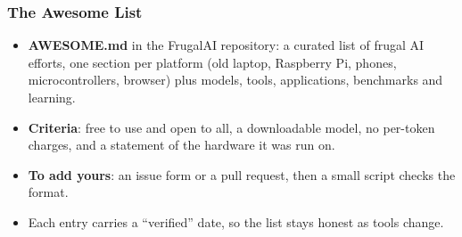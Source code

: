 \begin{frame}[fragile]\frametitle{The Awesome List}
\begin{itemize}
\item \textbf{AWESOME.md} in the FrugalAI repository: a curated list of frugal AI efforts, one section per platform (old laptop, Raspberry Pi, phones, microcontrollers, browser) plus models, tools, applications, benchmarks and learning.
\item \textbf{Criteria}: free to use and open to all, a downloadable model, no per-token charges, and a statement of the hardware it was run on.
\item \textbf{To add yours}: an issue form or a pull request, then a small script checks the format.
\item Each entry carries a ``verified'' date, so the list stays honest as tools change.
\end{itemize}
\end{frame}
